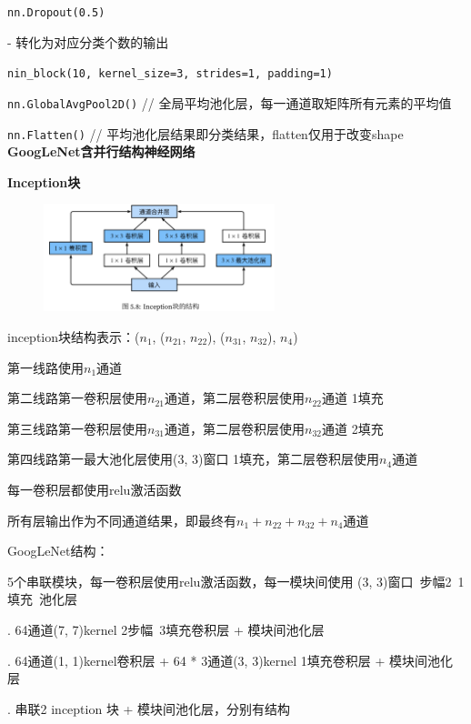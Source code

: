 \documentclass[UTF8]{ctexart}
\begin{document}
  \quad \texttt{nn.Dropout(0.5)}

  \quad - 转化为对应分类个数的输出

  \quad \texttt{nin\_block(10, kernel\_size=3, strides=1, padding=1)}

  \quad \texttt{nn.GlobalAvgPool2D()} // 全局平均池化层，每一通道取矩阵所有元素的平均值

  \quad \texttt{nn.Flatten()} // 平均池化层结果即分类结果，flatten仅用于改变shape\\
\textbf{GoogLeNet含并行结构神经网络}

  \textbf{Inception块}
  \begin{figure}[H] %
    \centering %
    \includegraphics[width=0.6\textwidth]{note_images/inception_block.png} %
  \end{figure}

  \quad inception块结构表示：($n_1$, ($n_{21}$, $n_{22}$), ($n_{31}$, $n_{32}$), $n_4$) 
  
  \quad \quad 第一线路使用$n_1$通道
 
  \quad \quad 第二线路第一卷积层使用$n_{21}$通道，第二层卷积层使用$n_{22}$通道 1填充
 
  \quad \quad 第三线路第一卷积层使用$n_{31}$通道，第二层卷积层使用$n_{32}$通道 2填充
  
  \quad \quad 第四线路第一最大池化层使用(3, 3)窗口 1填充，第二层卷积层使用$n_4$通道

  \quad 每一卷积层都使用relu激活函数

  \quad 所有层输出作为不同通道结果，即最终有$n_1 + n_{22} + n_{32} + n_4$通道

  GoogLeNet结构：

  \quad 5个串联模块，每一卷积层使用relu激活函数，每一模块间使用 (3, 3)窗口\ 步幅2\ 1填充\ 池化层

  . 64通道(7, 7)kernel 2步幅\ 3填充卷积层 + 模块间池化层

  . 64通道(1, 1)kernel卷积层 + 64 * 3通道(3, 3)kernel 1填充卷积层 + 模块间池化层

  . 串联2 inception 块 + 模块间池化层，分别有结构
\end{document}
